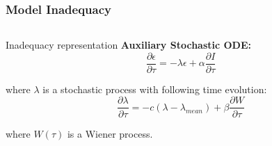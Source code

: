 \documentclass[10pt,xcolor=dvipsnames,compress]{beamer}
\begin{document}
\begin{frame}
\frametitle{Model Inadequacy}
\vfill


\begin{columns}
\begin{column}{.42\textwidth}
\begin{alertblock}{Inadequacy representation}
\textbf{Auxiliary Stochastic ODE:}
\begin{equation*}
\frac{\partial\epsilon}{\partial\tau} = -\lambda\epsilon + \alpha \frac{\partial I}{\partial\tau}
\end{equation*}

where $\lambda$ is a stochastic process with following time evolution:
\begin{equation*}
\frac{\partial\lambda}{\partial\tau} = -c(\lambda - \lambda_{mean}) + \beta \frac{\partial W}{\partial\tau}
\end{equation*}

where $W(\tau)$ is a Wiener process.%
\end{alertblock}


\end{column}
\end{columns}
\end{frame}
\end{document}
